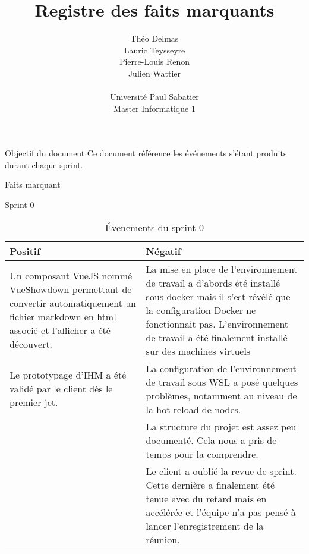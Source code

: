 \documentclass[]{article}
\title{Registre des faits marquants}
\author{
    Théo Delmas\\
    Lauric Teysseyre\\
    Pierre-Louis Renon\\
    Julien Wattier\\
    \\
    Université Paul Sabatier\\
    Master Informatique 1\\
   }
\begin{document}
\maketitle
\newpage
\tableofcontents
\newpage

\begin{section}{Objectif du document}
 Ce document référence les événements s'étant produits durant chaque sprint.
\end{section}

{
\setlength{\parindent}{0pt} %
\begin{section}{Faits marquant}
    \begin{subsection}{Sprint 0}
        \begin{table}[H]
            \caption{Évenements du sprint 0}
            \begin{tabularx}{\columnwidth}{|X|X|}
                \hline
                \cellcolor[HTML]{17FF00}Positif & \cellcolor[HTML]{FF2D00}Négatif\\
                \hline
                Un composant VueJS nommé VueShowdown permettant de convertir automatiquement un fichier markdown en html associé et l'afficher a été découvert.& La mise en place de l'environnement de travail a d'abords été installé sous docker mais il s'est révélé que la configuration Docker ne fonctionnait pas. L'environnement de travail a été finalement installé sur des machines virtuels\\
                \hline
                Le prototypage d'IHM a été validé par le client dès le premier jet. & La configuration de l'environnement de travail sous WSL a posé quelques problèmes, notamment au niveau de la hot-reload de nodes.\\
                \hline
                & La structure du projet est assez peu documenté. Cela nous a pris de temps pour la comprendre.\\
                \hline
                & Le client a oublié la revue de sprint. Cette dernière a finalement été tenue avec du retard mais en accélérée et l'équipe n'a pas pensé à lancer l'enregistrement de la réunion.\\
                \hline
            \end{tabularx}
        \end{table}
    \end{subsection}


\end{section}}
\end{document}

